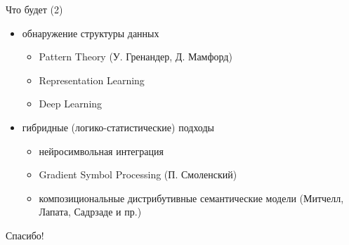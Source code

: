 \documentclass{beamer}
\begin{document}
\begin{frame}{Что будет (2)}
\begin{small}
\begin{itemize}
	\item обнаружение структуры данных
	\begin{itemize}
    	\item Pattern Theory (У. Гренандер, Д. Мамфорд)
	    \item Representation Learning
	    \item Deep Learning
	\end{itemize}
	\item гибридные (логико-статистические) подходы
	\begin{itemize}
    	\item нейросимвольная интеграция
	    \item Gradient Symbol Processing (П. Смоленский)
	    \item композициональные дистрибутивные семантические модели (Митчелл, Лапата, Садрзаде и пр.)
	\end{itemize}
\end{itemize}
\end{small}
\end{frame}


\begin{frame}{}
    \thispagestyle{empty}
    \begin{center}
        {\large Спасибо!}
    \end{center}
\end{frame}


\end{document}
